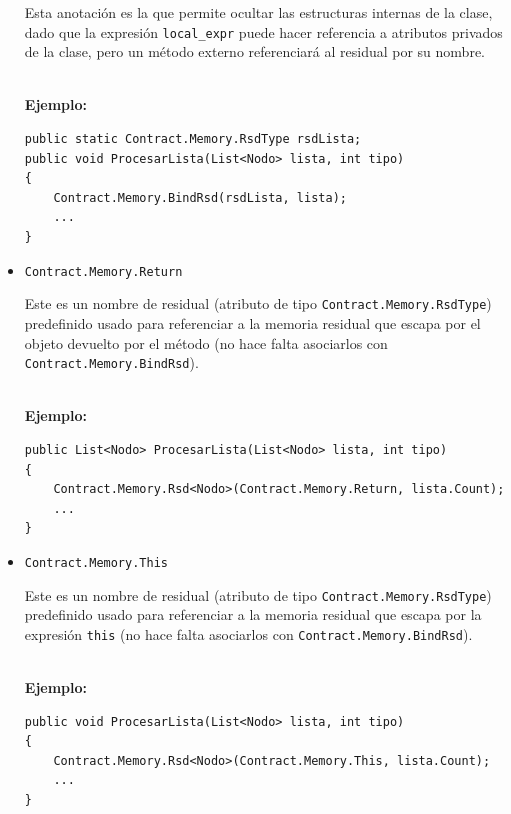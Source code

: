 \documentclass[12pt,a4paper]{article}
\newcommand\mono[1]{\texttt{#1}}
\begin{document}
\begin{itemize}
					Esta anotación es la que permite ocultar las estructuras internas de la clase, dado que la expresión \mono{local\_expr} puede hacer referencia a atributos privados de la clase, pero un método externo referenciará al residual por su nombre.

					\noindent\\
					\textbf{Ejemplo:}
					\begin{footnotesize}
					\begin{lstlisting}[caption=Ejemplo de \mono{Contract.Memory.BindRsd},numbers=none]
public static Contract.Memory.RsdType rsdLista;
public void ProcesarLista(List<Nodo> lista, int tipo)
{
	Contract.Memory.BindRsd(rsdLista, lista);
	...
}
					\end{lstlisting}
					\end{footnotesize}
				\item
					\mono{Contract.Memory.Return}

					Este es un nombre de residual (atributo de tipo \mono{Contract.Memory.RsdType}) predefinido usado para referenciar a la memoria residual que escapa por el objeto devuelto por el método (no hace falta asociarlos con \mono{Contract.Memory.BindRsd}).

					\noindent\\
					\textbf{Ejemplo:}
					\begin{footnotesize}
					\begin{lstlisting}[caption=Ejemplo de \mono{Contract.Memory.Return},numbers=none]
public List<Nodo> ProcesarLista(List<Nodo> lista, int tipo)
{
	Contract.Memory.Rsd<Nodo>(Contract.Memory.Return, lista.Count);
	...
}
					\end{lstlisting}
					\end{footnotesize}
				\item
					\mono{Contract.Memory.This}

					Este es un nombre de residual (atributo de tipo \mono{Contract.Memory.RsdType}) predefinido usado para referenciar a la memoria residual que escapa por la expresión \mono{this} (no hace falta asociarlos con \mono{Contract.Memory.BindRsd}).

					\noindent\\
					\textbf{Ejemplo:}
					\begin{footnotesize}
					\begin{lstlisting}[caption=Ejemplo de \mono{Contract.Memory.This},numbers=none]
public void ProcesarLista(List<Nodo> lista, int tipo)
{
	Contract.Memory.Rsd<Nodo>(Contract.Memory.This, lista.Count);
	...
}
					\end{lstlisting}
					\end{footnotesize}
			\end{itemize}
\end{document}

